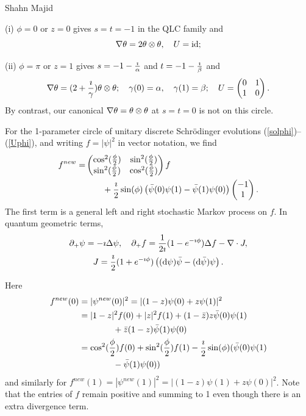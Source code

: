 \begin{artengenv}{Shahn Majid}
\begin{example}
(i) $\phi=0$ or $z=0$ gives $s=t=-1$ in the QLC family and
\[ \nabla\theta=2\theta\otimes\theta,\quad U={\rm id};\]

(ii) $\phi=\pi$ or $z=1$  gives $s=-1-{\imath\over \alpha}$ and $t=-1-{\imath\over \beta}$ and
\[ \nabla\theta=(2+{\imath \over \gamma})\theta\otimes\theta;\quad \gamma(0)=\alpha,\quad \gamma(1)=\beta;\quad U=\begin{pmatrix}0&1\\1&0\end{pmatrix}.\]
By contrast, our canonical $\nabla\theta=\theta\otimes\theta$ at $s=t=0$ is not on this circle. 

\begin{proposition} For the 1-parameter circle of unitary discrete Schr\"odinger evolutions (\ref{solphi})--(\ref{Uphi}), and writing $f=|\psi|^2$ in vector notation, we find
\begin{align*}
f^{new}=&\begin{pmatrix} \cos^2({\phi\over 2}) & \sin^2({\phi\over 2})\\ \sin^2({\phi\over 2}) & \cos^2({\phi\over 2})\end{pmatrix}f\\ &\qquad+{\imath\over 2}\sin(\phi) \left(\bar\psi(0)\psi(1)-\bar\psi(1)\psi(0)\right)\begin{pmatrix}-1\\ 1\end{pmatrix}.
\end{align*}
The first term is a general left and right stochastic Markov process on $f$. In quantum geometric terms,
\[\begin{gathered}
{\partial}_+\psi= -\imath\Delta\psi,\quad {\partial}_+f={1\over 2\imath}(1-e^{-\imath\phi})\Delta f- \nabla\cdot J,\\
J={\imath\over 2} (1+e^{-\imath\phi})\left(({\rm d}\psi)\bar\psi-({\rm d}\bar\psi)\psi\right). 
\end{gathered} \]
\end{proposition}
\proof Here 
\begin{align*} f^{new}(0)&=|\psi^{new}(0)|^2=|(1-z)\psi(0)+z\psi(1)|^2\\
&=|1-z|^2f(0)+|z|^2f(1)+(1-\bar z)z\bar\psi(0)\psi(1)\\
&\qquad\qquad + \bar z(1-z)\bar\psi(1)\psi(0)\\
&=\cos^2({\phi\over 2})f(0)+ \sin^2({\phi\over 2})f(1)- {\imath\over 2}\sin(\phi)(\bar\psi(0)\psi(1)\\
&\qquad\qquad -\bar\psi(1)\psi(0))\end{align*}
and similarly for $f^{new}(1)=|\psi^{new}(1)|^2=|(1-z)\psi(1)+z\psi(0)|^2$. Note that the entries of $f$ remain positive and summing to 1 even though there is an extra divergence term. 


\end{example}
\end{artengenv}
